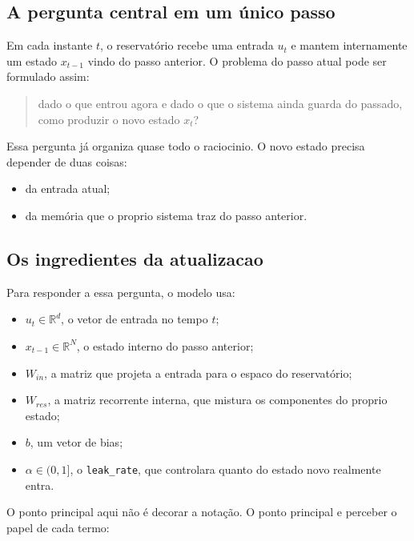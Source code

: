 \documentclass[12pt]{article}
\providecommand{\tightlist}{%
              \setlength{\itemsep}{0pt}\setlength{\parskip}{0pt}}
\begin{document}
\subsection{A pergunta central em um único passo}\label{31-a-pergunta-central-em-um-uxfanico-passo}

Em cada instante \(t\), o reservatório recebe uma entrada \(u_t\) e mantem internamente um estado \(x_{t-1}\) vindo do passo anterior. O problema do passo atual pode ser formulado assim:

\begin{quote}
dado o que entrou agora e dado o que o sistema ainda guarda do passado, como produzir o novo estado \(x_t\)?
\end{quote}

Essa pergunta já organiza quase todo o raciocinio. O novo estado precisa depender de duas coisas:

\begin{itemize}
\tightlist
\item
  da entrada atual;
\item
  da memória que o proprio sistema traz do passo anterior.
\end{itemize}

\subsection{Os ingredientes da atualizacao}\label{32-os-ingredientes-da-atualizacao}

Para responder a essa pergunta, o modelo usa:

\begin{itemize}
\tightlist
\item
  \(u_t \in \mathbb{R}^d\), o vetor de entrada no tempo \(t\);
\item
  \(x_{t-1} \in \mathbb{R}^N\), o estado interno do passo anterior;
\item
  \(W_{in}\), a matriz que projeta a entrada para o espaco do reservatório;
\item
  \(W_{res}\), a matriz recorrente interna, que mistura os componentes do proprio estado;
\item
  \(b\), um vetor de bias;
\item
  \(\alpha \in (0,1]\), o \texttt{leak\_rate}, que controlara quanto do estado novo realmente entra.
\end{itemize}

O ponto principal aqui não é decorar a notação. O ponto principal e perceber o papel de cada termo:
\end{document}
